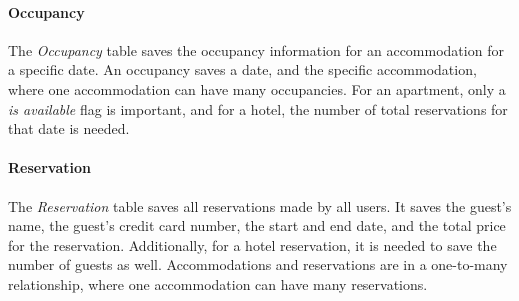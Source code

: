 \paragraph{Occupancy}
The \textit{Occupancy} table saves the occupancy information for an accommodation for a specific date. An occupancy saves a date, and the specific accommodation, where one accommodation can have many occupancies. For an apartment, only a \textit{is available} flag is important, and for a hotel, the number of total reservations for that date is needed.

\paragraph{Reservation}
The \textit{Reservation} table saves all reservations made by all users. It saves the guest's name, the guest's credit card number, the start and end date, and the total price for the reservation. Additionally, for a hotel reservation, it is needed to save the number of guests as well. Accommodations and reservations are in a one-to-many relationship, where one accommodation can have many reservations.

